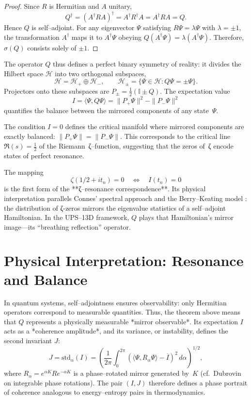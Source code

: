 \begin{proof}
Since $R$ is Hermitian and $A$ unitary,
\[
Q^{\dagger} = (A^{\dagger} R A)^{\dagger}
           = A^{\dagger} R^{\dagger} A
           = A^{\dagger} R A = Q.
\]
Hence $Q$ is self–adjoint.
For any eigenvector $\Psi$ satisfying $R\Psi = \lambda \Psi$ with $\lambda = \pm 1$,
the transformation $A^{\dagger}$ maps it to $A^{\dagger}\Psi$ obeying
$Q(A^{\dagger}\Psi) = \lambda(A^{\dagger}\Psi)$.
Therefore, $\sigma(Q)$ consists solely of $\pm 1$.
\end{proof}

The operator $Q$ thus defines a perfect binary symmetry of reality:
it divides the Hilbert space $\mathcal{H}$ into two orthogonal subspaces,
\[
\mathcal{H} = \mathcal{H}_+ \oplus \mathcal{H}_-, \qquad
\mathcal{H}_{\pm} = \{ \Psi \in \mathcal{H} : Q\Psi = \pm \Psi \}.
\]
Projectors onto these subspaces are
$P_{\pm} = \tfrac12(\mathbb{I} \pm Q)$.
The expectation value
\[
I = \langle \Psi, Q \Psi \rangle
    = \|P_{+}\Psi\|^2 - \|P_{-}\Psi\|^2
\]
quantifies the balance between the mirrored components of any state~$\Psi$.

\begin{corollary}
The condition $I=0$ defines the critical manifold
where mirrored components are exactly balanced:
$\|P_{+}\Psi\|=\|P_{-}\Psi\|$.
This corresponds to the critical line $\Re(s)=\tfrac12$
of the Riemann~ζ–function,
suggesting that the zeros of~ζ encode states of perfect resonance.
\end{corollary}

The mapping
\[
\zeta(1/2 + i t_n)=0
\quad\Longleftrightarrow\quad
I(t_n)=0
\]
is the first form of the **ζ–resonance correspondence**.
Its physical interpretation parallels Connes’ spectral approach
\cite{Connes1999} and the Berry–Keating model
\cite{BerryKeating2008}: the distribution of ζ-zeros
mirrors the eigenvalue statistics of a self–adjoint Hamiltonian.
In the UPS–13D framework, $Q$ plays that Hamiltonian’s
mirror image—its “breathing reflection” operator.

\section{Physical Interpretation: Resonance and Balance}

In quantum systems, self–adjointness ensures observability:
only Hermitian operators correspond to measurable quantities.
Thus, the theorem above means that $Q$ represents
a physically measurable *mirror observable*.
Its expectation $I$ acts as a *coherence amplitude*,
and its variance, or instability, defines the second invariant $J$:
\[
J = \mathrm{std}_{\alpha}(I)
   = \left(
      \frac{1}{2\pi}\int_0^{2\pi}
      ( \langle \Psi, R_{\alpha}\Psi\rangle
       - \overline{I} )^2\,d\alpha
     \right)^{1/2},
\]
where $R_{\alpha}= e^{\alpha K} R e^{-\alpha K}$
is a phase–rotated mirror generated by~$K$
(cf.~Dubrovin~\cite{Dubrovin1996} on integrable phase rotations).
The pair $(I,J)$ therefore defines a phase portrait of coherence
analogous to energy–entropy pairs in thermodynamics.

